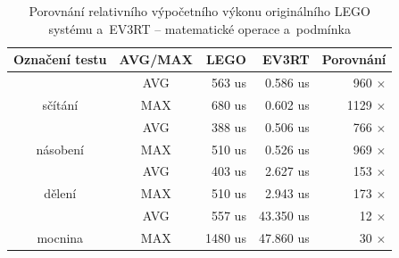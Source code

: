 \begin{table}[h]
\centering

\caption{Porovnání relativního výpočetního výkonu originálního LEGO systému a~EV3RT -- matematické operace a~podmínka \\
}

\label{Benchmark-math}
\begin{tabular}{@{}ccrrr@{}}
\toprule
Označení testu                                       & AVG/MAX                     & LEGO                               & EV3RT                                & Porovnání                                                    \\ \midrule
\multicolumn{1}{|c}{}                                & \cellcolor[HTML]{EFEFEF}AVG & \cellcolor[HTML]{EFEFEF}    563 us & \cellcolor[HTML]{EFEFEF}    0.586 us & \multicolumn{1}{r|}{\cellcolor[HTML]{EFEFEF}    960 $\times$}  \\
\multicolumn{1}{|c}{\multirow{-2}{*}{sčítání}}           & \cellcolor[HTML]{FFFFFF}MAX & \cellcolor[HTML]{FFFFFF}    680 us & \cellcolor[HTML]{FFFFFF}    0.602 us & \multicolumn{1}{r|}{\cellcolor[HTML]{FFFFFF}   1129 $\times$}  \\ \midrule
\multicolumn{1}{|c}{}                                & \cellcolor[HTML]{EFEFEF}AVG & \cellcolor[HTML]{EFEFEF}    388 us & \cellcolor[HTML]{EFEFEF}    0.506 us & \multicolumn{1}{r|}{\cellcolor[HTML]{EFEFEF}    766 $\times$}  \\
\multicolumn{1}{|c}{\multirow{-2}{*}{násobení}}          & \cellcolor[HTML]{FFFFFF}MAX & \cellcolor[HTML]{FFFFFF}    510 us & \cellcolor[HTML]{FFFFFF}    0.526 us & \multicolumn{1}{r|}{\cellcolor[HTML]{FFFFFF}    969 $\times$}  \\ \midrule
\multicolumn{1}{|c}{}                                & \cellcolor[HTML]{EFEFEF}AVG & \cellcolor[HTML]{EFEFEF}    403 us & \cellcolor[HTML]{EFEFEF}    2.627 us & \multicolumn{1}{r|}{\cellcolor[HTML]{EFEFEF}    153 $\times$}  \\
\multicolumn{1}{|c}{\multirow{-2}{*}{dělení}}           & \cellcolor[HTML]{FFFFFF}MAX & \cellcolor[HTML]{FFFFFF}    510 us & \cellcolor[HTML]{FFFFFF}    2.943 us & \multicolumn{1}{r|}{\cellcolor[HTML]{FFFFFF}    173 $\times$}  \\ \midrule
\multicolumn{1}{|c}{}                                & \cellcolor[HTML]{EFEFEF}AVG & \cellcolor[HTML]{EFEFEF}    557 us & \cellcolor[HTML]{EFEFEF}   43.350 us & \multicolumn{1}{r|}{\cellcolor[HTML]{EFEFEF}     12 $\times$}  \\
\multicolumn{1}{|c}{\multirow{-2}{*}{mocnina}}           & \cellcolor[HTML]{FFFFFF}MAX & \cellcolor[HTML]{FFFFFF}   1480 us & \cellcolor[HTML]{FFFFFF}   47.860 us & \multicolumn{1}{r|}{\cellcolor[HTML]{FFFFFF}     30 $\times$}  \\ \midrule

\end{tabular}
\end{table}
